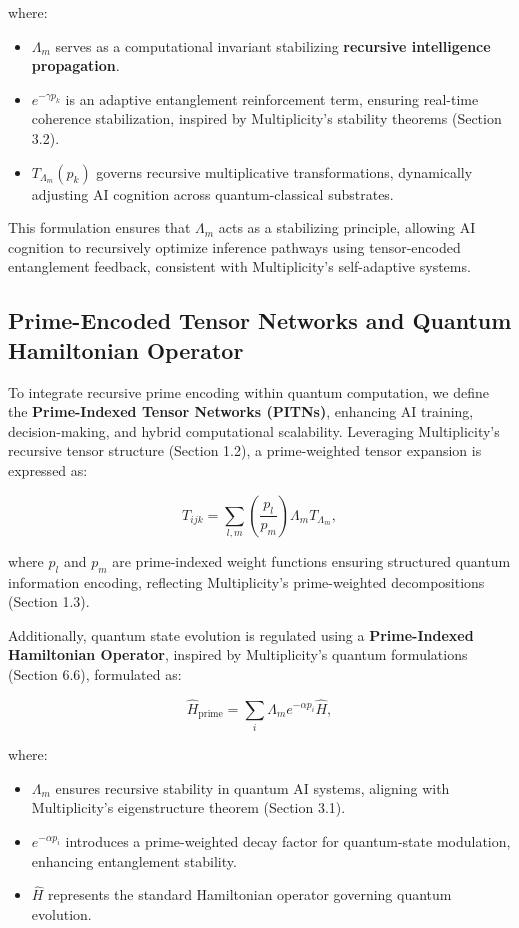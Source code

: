 \documentclass[12pt]{article}
\begin{document}
where:
\begin{itemize}
    \item \(\Lambda_m\) serves as a computational invariant stabilizing \textbf{recursive intelligence propagation}.
    \item \(e^{-\gamma p_k}\) is an adaptive entanglement reinforcement term, ensuring real-time coherence stabilization, inspired by Multiplicity’s stability theorems (Section 3.2).
    \item \(T_{\Lambda_m} (p_k)\) governs recursive multiplicative transformations, dynamically adjusting AI cognition across quantum-classical substrates.
\end{itemize}

This formulation ensures that \(\Lambda_m\) acts as a stabilizing principle, allowing AI cognition to recursively optimize inference pathways using tensor-encoded entanglement feedback, consistent with Multiplicity’s self-adaptive systems.

\subsection{Prime-Encoded Tensor Networks and Quantum Hamiltonian Operator}

To integrate recursive prime encoding within quantum computation, we define the \textbf{Prime-Indexed Tensor Networks (PITNs)}, enhancing AI training, decision-making, and hybrid computational scalability. Leveraging Multiplicity’s recursive tensor structure (Section 1.2), a prime-weighted tensor expansion is expressed as:

\begin{equation}
    T_{ijk} = \sum_{l,m} \left( \frac{p_l}{p_m} \right) \Lambda_m T_{\Lambda_m},
\end{equation}

where \(p_l\) and \(p_m\) are prime-indexed weight functions ensuring structured quantum information encoding, reflecting Multiplicity’s prime-weighted decompositions (Section 1.3).

Additionally, quantum state evolution is regulated using a \textbf{Prime-Indexed Hamiltonian Operator}, inspired by Multiplicity’s quantum formulations (Section 6.6), formulated as:

\begin{equation}
    \hat{H}_{\text{prime}} = \sum_{i} \Lambda_m e^{-\alpha p_i} \hat{H},
\end{equation}

where:
\begin{itemize}
    \item \(\Lambda_m\) ensures recursive stability in quantum AI systems, aligning with Multiplicity’s eigenstructure theorem (Section 3.1).
    \item \(e^{-\alpha p_i}\) introduces a prime-weighted decay factor for quantum-state modulation, enhancing entanglement stability.
    \item \(\hat{H}\) represents the standard Hamiltonian operator governing quantum evolution.
\end{itemize}
\end{document}

